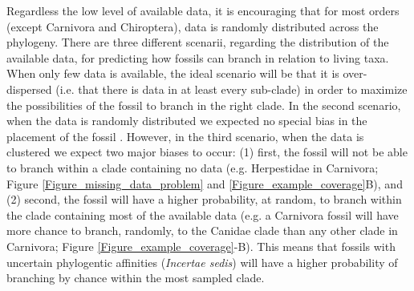 \documentclass[12pt,letterpaper]{article}
\begin{document}
Regardless the low level of available data, it is encouraging that for most orders (except Carnivora and Chiroptera), data is randomly distributed across the phylogeny.
There are three different scenarii, regarding the distribution of the available data, for predicting how fossils can branch in relation to living taxa.
When only few data is available, the ideal scenario will be that it is over-dispersed (i.e. that there is data in at least every sub-clade) in order to maximize the possibilities of the fossil to branch in the right clade.
In the second scenario, when the data is randomly distributed we expected no special bias in the placement of the fossil \citep{GuillermeCooper}.
However, in the third scenario, when the data is clustered we expect two major biases to occur: (1) first, the fossil will not be able to branch within a clade containing no data (e.g. Herpestidae in Carnivora; Figure \ref{Figure_missing_data_problem} and \ref{Figure_example_coverage}B), and (2) second, the fossil will have a higher probability, at random, to branch within the clade containing most of the available data (e.g. a Carnivora fossil will have more chance to branch, randomly, to the Canidae clade than any other clade in Carnivora; Figure \ref{Figure_example_coverage}-B).
This means that fossils with uncertain phylogentic affinities (\textit{Incertae sedis}) will have a higher probability of branching by chance within the most sampled clade.

\end{document}
